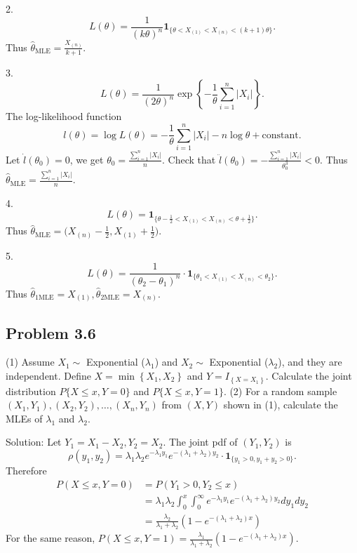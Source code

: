 2.
\[
L(\theta)=\frac{1}{(k\theta)^{n}}\mathbf{1}_{\{\theta<X_{(1)}<X_{(n)}<(k+1)\theta\}}.
\]
Thus $\hat{\theta}_{\text{MLE}}=\frac{X_{(n)}}{k+1}$.

3.
\[
L(\theta)=\frac{1}{(2\theta)^{n}}\exp\left\{-\frac{1}{\theta}\sum_{i=1}^{n}|X_{i}|\right\}.
\]
The log-likelihood function
\[
l(\theta)=\log L(\theta)=-\frac{1}{\theta}\sum_{i=1}^{n}|X_{i}|-n\log\theta+\text{constant}.
\]
Let $\dot{l}(\theta_0)=0$, we get $\theta_0=\frac{\sum_{i=1}^{n}|X_{i}|}{n}$. Check that $\ddot{l}(\theta_0)=-\frac{\sum_{i=1}^{n}|X_{i}|}{\theta_0^{3}}<0$. Thus $\hat{\theta}_{\text{MLE}}=\frac{\sum_{i=1}^{n}|X_{i}|}{n}$.

4.
\[
L(\theta)=\mathbf{1}_{\{\theta-\frac{1}{2}<X_{(1)}<X_{(n)}<\theta+\frac{1}{2}\}}.
\]
Thus $\hat{\theta}_{\text{MLE}}=\big(X_{(n)}-\frac{1}{2},X_{(1)}+\frac{1}{2}\big)$.

5.
\[
L(\theta)=\frac{1}{(\theta_{2}-\theta_{1})^{n}}\cdot \mathbf{1}_{\{\theta_{1}<X_{(1)}<X_{(n)}<\theta_{2}\}}.
\]
Thus $\hat{\theta}_{1\text{MLE}}=X_{(1)},\hat{\theta}_{2\text{MLE}}=X_{(n)}$.

\subsection*{Problem 3.6}
(1) Assume $X_{1}\sim$ Exponential ($\lambda_{1}$) and $X_{2}\sim$ Exponential ($\lambda_{2}$), and they are independent. Define $X=\min\left\{X_{1},X_{2}\right\}$ and $Y=I_{\left\{X=X_{1}\right\}}$. Calculate the joint distribution $P\{X\leq x,Y=0\}$ and $P\{X\leq x,Y=1\}$.
(2) For a random sample $(X_{1},Y_{1}),(X_{2},Y_{2}),\ldots,(X_{n},Y_{n})$ from $(X,Y)$ shown in (1), calculate the MLEs of $\lambda_{1}$ and $\lambda_{2}$.

{Solution:}
Let $Y_{1}=X_{1}-X_{2},Y_{2}=X_{2}$. The joint pdf of $(Y_{1},Y_{2})$ is
\[
\rho\left(y_{1},y_{2}\right)=\lambda_{1}\lambda_{2}e^{-\lambda_{1}y_{1}}e^{-(\lambda_{1}+\lambda_{2})y_{2}}\cdot \mathbf{1}_{\{y_{1}>0,y_{1}+y_{2}>0\}}.
\]
Therefore
\begin{align*}
P(X\leq x,Y=0)&=P(Y_{1}>0,Y_{2}\leq x)\\
&=\lambda_{1}\lambda_{2}\int_{0}^{x}\int_{0}^{\infty}e^{-\lambda_{1}y_{1}}e^{-(\lambda_{1}+\lambda_{2})y_{2}}dy_{1}dy_{2}\\
&=\frac{\lambda_{2}}{\lambda_{1}+\lambda_{2}}\left(1-e^{-(\lambda_{1}+\lambda_{2})x}\right)
\end{align*}
For the same reason, $P(X\leq x,Y=1)=\frac{\lambda_{1}}{\lambda_{1}+\lambda_{2}}\left(1-e^{-(\lambda_{1}+\lambda_{2})x}\right)$.

